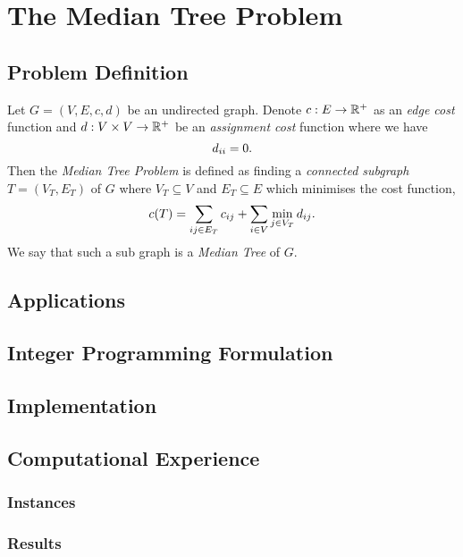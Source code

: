 
\chapter{The Median Tree Problem}
\label{chap:mediantree}

\section{Problem Definition}

Let $G = (V, E, c, d)$ be an undirected graph. Denote $c : E \to \mathbb{R}^+$ as an \textit{edge cost} function
and $d : V \times V  \to \mathbb{R}^+$ be an \textit{assignment cost} function where we have
$$d_{ii} = 0 \mathnormal{.}$$
Then the \textit{Median Tree Problem}
is defined as finding a \textit{connected subgraph} $T = (V_T, E_T)$ of $G$
where $V_T \subseteq V$ and
$E_T \subseteq E$ which minimises the cost function,
$$c(T) = \sum_{ij \in E_T} c_{ij} + \sum_{i \in V} \min_{j \in V_T} d_{ij}\mathnormal{.}$$
We say that such a sub graph is a \textit{Median Tree} of $G$.


\section{Applications}

\section{Integer Programming Formulation}

\section{Implementation}

\section{Computational Experience}

\subsection{Instances}

\subsection{Results}


